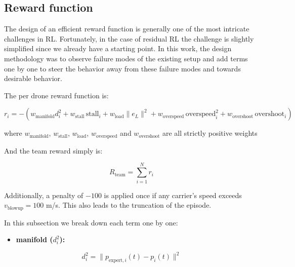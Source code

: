 \subsection{Reward function}

The design of an efficient reward function is generally one of the most
intricate challenges in RL. Fortunately, in the case of residual RL the
challenge is slightly simplified since we already have a starting point.
In this work, the design methodology was to observe failure modes of
the existing setup and add terms one by one to steer the behavior away
from these failure modes and towards desirable behavior.

The per drone reward function is:

\begin{equation}
  r_i = -\left( w_{\text{manifold}} d_i^2 + w_{\text{stall}} \,\text{stall}_i + w_{\text{load}} \|e_L\|^2 + w_{\text{overspeed}} \,\text{overspeed}_i^2 + w_{\text{overshoot}} \,\text{overshoot}_i \right)
  \label{eq:per-drone-reward}
\end{equation}

where $w_{\text{manifold}}$, $w_{\text{stall}}$, $w_{\text{load}}$,
$w_{\text{overspeed}}$ and $w_{\text{overshoot}}$ are all strictly
positive weights

And the team reward simply is:

\begin{equation}
  R_{\text{team}} = \sum_{i=1}^{N} r_i
  \label{eq:team-reward}
\end{equation}

Additionally, a penalty of $-100$ is applied once if any carrier’s speed
exceeds $v_{\text{blowup}} = 100$ m/s. This also leads to the truncation of
the episode.

In this subsection we break down each term one by one:

\begin{itemize}
  \item \textbf{manifold ($d_i^2$):}
\end{itemize}

\begin{equation}
  d_i^2 = \|p_{\text{expert},i}(t) - p_i(t)\|^2
  \label{eq:manifold-term}
\end{equation}

